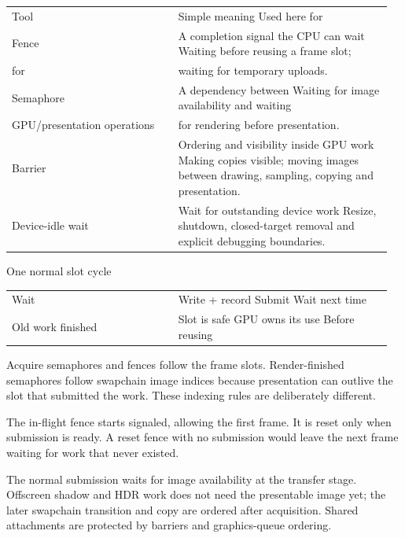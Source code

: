 \documentclass[11pt,a4paper]{article}
\begin{document}
{\small
\begin{longtable}{@{}p{0.42\linewidth}p{0.54\linewidth}@{}}
Tool & Simple meaning                               Used here for \\
Fence & A completion signal the CPU can wait         Waiting before reusing a frame slot; \\
for & waiting for temporary uploads. \\
Semaphore & A dependency between                         Waiting for image availability and waiting \\
GPU/presentation operations & for rendering before presentation. \\
Barrier & Ordering and visibility inside GPU work      Making copies visible; moving images between drawing, sampling, copying and presentation. \\
Device-idle wait & Wait for outstanding device work             Resize, shutdown, closed-target removal and explicit debugging boundaries. \\
\end{longtable}
}

One normal slot cycle

{\small
\begin{longtable}{@{}p{0.42\linewidth}p{0.54\linewidth}@{}}
Wait & Write + record                   Submit                    Wait next time \\
Old work finished & Slot is safe                GPU owns its use              Before reusing \\
\end{longtable}
}

Acquire semaphores and fences follow the frame slots. Render-finished semaphores follow swapchain image indices because presentation can outlive the slot that submitted the work. These indexing rules are deliberately different.

The in-flight fence starts signaled, allowing the first frame. It is reset only when submission is ready. A reset fence with no submission would leave the next frame waiting for work that never existed.

The normal submission waits for image availability at the transfer stage. Offscreen shadow and HDR work does not need the presentable image yet; the later swapchain transition and copy are ordered after acquisition. Shared attachments are protected by barriers and graphics-queue ordering.
\end{document}

